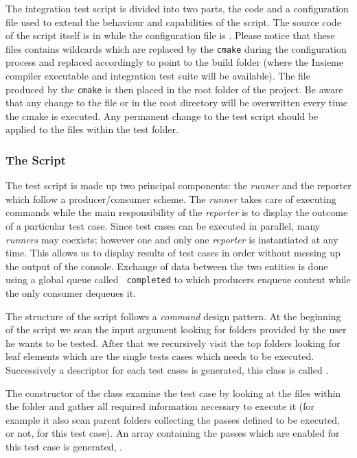 The integration test script is divided into two parts, the code and a
configuration file used to extend the behaviour and capabilities of the script.
The source code of the script itself is in 
while the configuration file is . Please notice that
these files contains wildcards which are replaced by the {\tt cmake} during the
configuration process and replaced accordingly to point to the build folder
(where the Insieme compiler executable and integration test suite will be
available). The file produced by the {\tt cmake} is then placed in the root
folder of the project. Be aware that any change to the file
 or  in the root directory will
be overwritten every time the cmake is executed.  Any permanent change to the
test script should be applied to the files within the test folder. 

\subsubsection{The Script}

The test script is made up two principal components: the {\em runner} and the
{\rm reporter} which follow a producer/consumer scheme. The {\em runner} takes
care of executing commands while the main responsibility of the {\em reporter}
is to display the outcome of a particular test case. Since test cases can be
executed in parallel, many {\em runners} may coexists; however one and only one
{\em reporter} is instantiated at any time. This allows us to display results of
test cases in order without messing up the output of the console. Exchange of
data between the two entities is done using a global queue called {\tt
completed} to which producers enqueue content while the only consumer dequeues
it. 

The structure of the script follows a {\em command} design pattern. At the
beginning of the script we scan the input argument looking for folders provided
by the user he wants to be tested. After that we recursively visit the top
folders looking for leaf elements which are the single tests cases which needs
to be executed. Successively a descriptor for each test cases is generated, this
class is called . 

The constructor of the  class examine the test case by looking at
the files within the folder and gather all required information necessary to
execute it (for example it also scan parent folders collecting the passes
defined to be executed, or not, for this test case). An array containing the
passes which are enabled for this test case is generated, .


